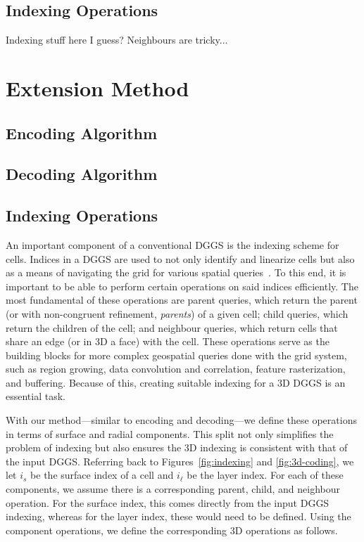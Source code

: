 \subsection{Indexing Operations}
Indexing stuff here I guess?
Neighbours are tricky...


\section{Extension Method}


\subsection{Encoding Algorithm}


\subsection{Decoding Algorithm}


\subsection{Indexing Operations}
An important component of a conventional DGGS is the indexing scheme for cells.
Indices in a DGGS are used to not only identify and linearize cells but also as a means of navigating the grid for various spatial queries~\cite{alderson2020digital}.
To this end, it is important to be able to perform certain operations on said indices efficiently.
The most fundamental of these operations are parent queries, which return the parent (or with non-congruent refinement, \textit{parents}) of a given cell; child queries, which return the children of the cell; and neighbour queries, which return cells that share an edge (or in 3D a face) with the cell.
These operations serve as the building blocks for more complex geospatial queries done with the grid system, such as region growing, data convolution and correlation, feature rasterization, and buffering.
Because of this, creating suitable indexing for a 3D DGGS is an essential task.


With our method---similar to encoding and decoding---we define these operations in terms of surface and radial components.
This split not only simplifies the problem of indexing but also ensures the 3D indexing is consistent with that of the input DGGS.
Referring back to Figures~\ref{fig:indexing} and \ref{fig:3d-coding}, we let $i_s$ be the surface index of a cell and $i_\ell$ be the layer index.
For each of these components, we assume there is a corresponding parent, child, and neighbour operation.
For the surface index, this comes directly from the input DGGS indexing, whereas for the layer index, these would need to be defined.
Using the component operations, we define the corresponding 3D operations as follows.


